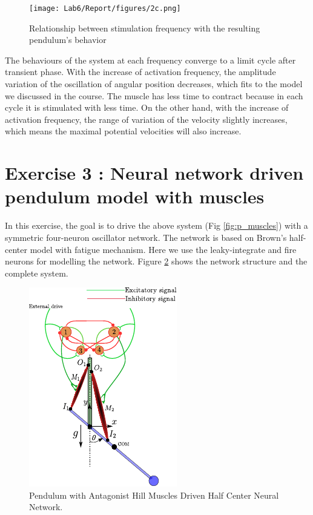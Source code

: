 \documentclass{cmc}
\begin{document}
\begin{figure}[H]
  \centering
  \texttt{[image: Lab6/Report/figures/2c.png]}
  \caption{Relationship between stimulation frequency with the resulting pendulum’s behavior}
  \label{2c}
\end{figure}



The behaviours of the system at each frequency converge to a limit cycle after transient phase. With the increase of activation frequency, the amplitude variation of the oscillation of angular position decreases, which fits to the model we discussed in the course. The muscle has less time to contract because in each cycle it is stimulated with less time.
On the other hand, with the increase of activation frequency, the range of variation of the velocity slightly increases, which means the maximal potential velocities will also increase.






\newpage
\section*{Exercise 3 : Neural network driven pendulum model with
  muscles}
\label{sec:neur-netw-driv}

In this exercise, the goal is to drive the above system (Fig
\ref{fig:p_muscles}) with a symmetric four-neuron oscillator
network. The network is based on Brown's half-center model with
fatigue mechanism. Here we use the leaky-integrate and fire neurons
for modelling the network. Figure \ref{fig:p_muscles_neurons} shows
the network structure and the complete system.

\begin{figure}[H]
  \centering
  \includegraphics[scale=1.5]{figures/pendulum_muscles_neurons.pdf}
  \caption{Pendulum with Antagonist Hill Muscles Driven Half Center
    Neural Network.}
  \label{fig:p_muscles_neurons}
\end{figure}
\end{document}
